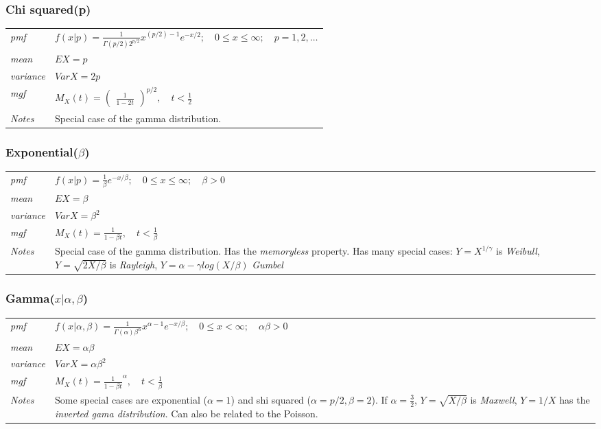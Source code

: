 \documentclass[12pt]{article}
\begin{document}
\subsubsection*{Chi squared(p)\cite[p. 623]{StatisticalInference}}
\begin{tabularx}{\textwidth}{ l X }
\emph{pmf} & $f(x|p)=\frac{1}{\Gamma(p/2)2^{p/2}}x^{(p/2)-1}e^{-x/2}; \quad 0 \leq x \leq \infty; \quad p=1, 2, \dots$ \\
\emph{mean} & $EX = p$ \\
\emph{variance} & $Var X = 2p$ \\
\emph{mgf} & $M_X(t)=\begin{pmatrix} \frac{1}{1-2t} \end{pmatrix}^{p/2}, \quad t < \frac{1}{2}$ \\
\emph{Notes} & Special case of the gamma distribution.\\
\end{tabularx}

\subsubsection*{Exponential($\beta$)\cite[p. 624]{StatisticalInference}}
\begin{tabularx}{\textwidth}{ l X }
\emph{pmf} & $f(x|p)=\frac{1}{\beta}e^{-x/\beta}; \quad 0 \leq x \leq \infty; \quad \beta>0$ \\
\emph{mean} & $EX = \beta$ \\
\emph{variance} & $Var X = \beta^2$ \\
\emph{mgf} & $M_X(t)= \frac{1}{1-\beta t}, \quad t < \frac{1}{\beta}$ \\
\emph{Notes} & Special case of the gamma distribution. Has the \emph{memoryless} property. Has many special cases: $Y=X^{1/\gamma}$ is \emph{Weibull}, $Y=\sqrt{2X/\beta}$ is \emph{Rayleigh}, $Y=\alpha - \gamma log(X/\beta)$ \emph{Gumbel}\\
\end{tabularx}

\subsubsection*{Gamma($x|\alpha, \beta$)\cite[p. 624]{StatisticalInference}}
\begin{tabularx}{\textwidth}{ l X }
\emph{pmf} & $f(x|\alpha, \beta)=\frac{1}{\Gamma(\alpha)\beta^{\alpha}} x^{\alpha - 1}e^{-x/\beta}; \quad 0 \leq x < \infty; \quad \alpha\beta>0$ \\
\emph{mean} & $EX = \alpha\beta$ \\
\emph{variance} & $Var X = \alpha\beta^2$ \\
\emph{mgf} & $M_X(t)= \frac{1}{1-\beta t}^{\alpha}, \quad t < \frac{1}{\beta}$ \\
\emph{Notes} & Some special cases are exponential ($\alpha = 1$) and shi squared ($\alpha = p/2, \beta = 2$). If $\alpha = \frac{3}{2}$, $Y=\sqrt{X/\beta}$ is \emph{Maxwell}, $Y=1/X$ has the \emph{inverted gama distribution}. Can also be related to the Poisson.\\
\end{tabularx}
\end{document}
